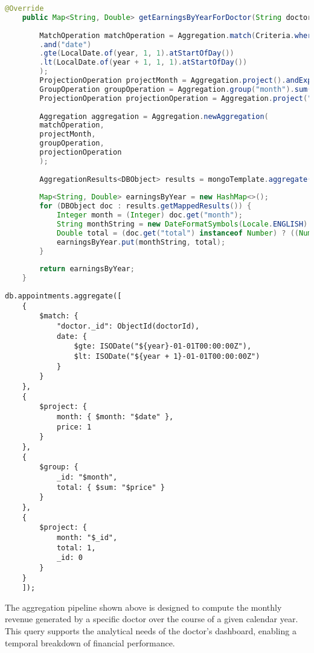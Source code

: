 \begin{lstlisting}[language=java, caption={Java code for the Earning analytic}]
	@Override
	public Map<String, Double> getEarningsByYearForDoctor(String doctorId, Integer year) {
		
		MatchOperation matchOperation = Aggregation.match(Criteria.where("doctor.id").is(doctorId)
		.and("date")
		.gte(LocalDate.of(year, 1, 1).atStartOfDay())
		.lt(LocalDate.of(year + 1, 1, 1).atStartOfDay())
		);
		ProjectionOperation projectMonth = Aggregation.project().andExpression("month(date)").as("month").and("price").as("price");
		GroupOperation groupOperation = Aggregation.group("month").sum("price").as("total");
		ProjectionOperation projectionOperation = Aggregation.project("total").and("month").previousOperation();
		
		Aggregation aggregation = Aggregation.newAggregation(
		matchOperation,
		projectMonth,
		groupOperation,
		projectionOperation
		);
		
		AggregationResults<DBObject> results = mongoTemplate.aggregate(aggregation, Appointment.class, DBObject.class);
		
		Map<String, Double> earningsByYear = new HashMap<>();
		for (DBObject doc : results.getMappedResults()) {
			Integer month = (Integer) doc.get("month");
			String monthString = new DateFormatSymbols(Locale.ENGLISH).getMonths()[month-1].toLowerCase();
			Double total = (doc.get("total") instanceof Number) ? ((Number) doc.get("total")).doubleValue() : null;
			earningsByYear.put(monthString, total);
		}
		
		return earningsByYear;
	}
\end{lstlisting}

\begin{lstlisting}[language=mongodb, caption={Equivalent MongoDB Aggregation Pipeline for the Earning analytic}]
	db.appointments.aggregate([
	{
		$match: {
			"doctor._id": ObjectId(doctorId),
			date: {
				$gte: ISODate("${year}-01-01T00:00:00Z"),
				$lt: ISODate("${year + 1}-01-01T00:00:00Z")
			}
		}
	},
	{
		$project: {
			month: { $month: "$date" },
			price: 1
		}
	},
	{
		$group: {
			_id: "$month",
			total: { $sum: "$price" }
		}
	},
	{
		$project: {
			month: "$_id",
			total: 1,
			_id: 0
		}
	}
	]); 
\end{lstlisting}

The aggregation pipeline shown above is designed to compute the monthly revenue generated by a specific doctor over the course of a given calendar year. This query supports the analytical needs of the doctor's dashboard, enabling a temporal breakdown of financial performance.

